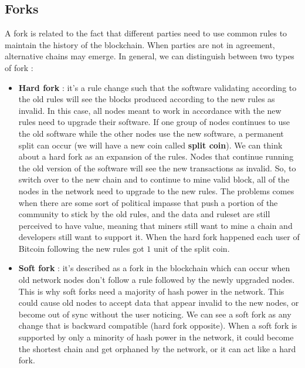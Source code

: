 \subsection{Forks}
A fork is related to the fact that different parties need to use common rules to maintain the history of the blockchain. When parties are not in agreement, alternative chains may emerge. In general, we can distinguish between two types of fork :
\begin{itemize}
\item \textbf{Hard fork} : it's a rule change such that the software validating according to the old rules will see the blocks produced according to the new rules as invalid. In this case, all nodes meant to work in accordance with the new rules need to upgrade their software. If one group of nodes continues to use the old software while the other nodes use the new software, a permanent split can occur (we will have a new coin called \textbf{split coin}). We can think about a hard fork as an expansion of the rules. Nodes that continue running the old version of the software will see the new transactions as invalid. So, to switch over to the new chain and to continue to mine valid block, all of the nodes in the network need to upgrade to the new rules. The problems comes when there are some sort of political impasse that push a portion of the community to stick by the old rules, and the data and ruleset are still perceived to have value, meaning that miners still want to mine a chain and developers still want to support it. When the hard fork happened each user of Bitcoin following the new rules got $1$ unit of the split coin.
\item \textbf{Soft fork} : it's described as a fork in the blockchain which can occur when old network nodes don't follow a rule followed by the newly upgraded nodes. This is why soft forks need a majority of hash power in the network. This could cause old nodes to accept data that appear invalid to the new nodes, or become out of sync without the user noticing. We can see a soft fork as any change that is backward compatible (hard fork opposite). When a soft fork is supported by only a minority of hash power in the network, it could become the shortest chain and get orphaned by the network, or it can act like a hard fork.
\end{itemize}
